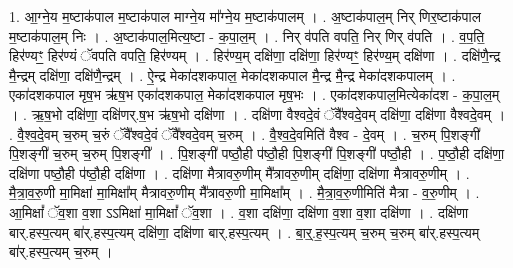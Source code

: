 \documentclass[17pt]{extarticle}
\begin{document}
1. आ॒ग्ने॒य म॒ष्टाक॑पाल म॒ष्टाक॑पाल माग्ने॒य मा᳚ग्ने॒य म॒ष्टाक॑पालम् । . अ॒ष्टाक॑पाल॒म् निर् णिर॒ष्टाक॑पाल म॒ष्टाक॑पाल॒म् निः । . अ॒ष्टाक॑पाल॒मित्य॒ष्टा - क॒पा॒ल॒म् । . निर् व॑पति वपति॒ निर् णिर् व॑पति । . व॒प॒ति॒ हिर॑ण्यꣳ॒॒ हिर॑ण्यं ॅवपति वपति॒ हिर॑ण्यम् । . हिर॑ण्य॒म् दक्षि॑णा॒ दक्षि॑णा॒ हिर॑ण्यꣳ॒॒ हिर॑ण्य॒म् दक्षि॑णा । . दक्षि॑णै॒न्द्र मै॒न्द्रम् दक्षि॑णा॒ दक्षि॑णै॒न्द्रम् । . ऐ॒न्द्र मेका॑दशकपाल॒ मेका॑दशकपाल मै॒न्द्र मै॒न्द्र मेका॑दशकपालम् । . एका॑दशकपाल मृष॒भ ऋ॑ष॒भ एका॑दशकपाल॒ मेका॑दशकपाल मृष॒भः । . एका॑दशकपाल॒मित्येका॑दश - क॒पा॒ल॒म् । . ऋ॒ष॒भो दक्षि॑णा॒ दक्षि॑णर्.ष॒भ ऋ॑ष॒भो दक्षि॑णा । . दक्षि॑णा वैश्वदे॒वं ॅवै᳚श्वदे॒वम् दक्षि॑णा॒ दक्षि॑णा वैश्वदे॒वम् । . वै॒श्व॒दे॒वम् च॒रुम् च॒रुं ॅवै᳚श्वदे॒वं ॅवै᳚श्वदे॒वम् च॒रुम् । . वै॒श्व॒दे॒वमिति॑ वैश्व - दे॒वम् । . च॒रुम् पि॒शङ्गी॑ पि॒शङ्गी॑ च॒रुम् च॒रुम् पि॒शङ्गी᳚ । . पि॒शङ्गी॑ पष्ठौ॒ही प॑ष्ठौ॒ही पि॒शङ्गी॑ पि॒शङ्गी॑ पष्ठौ॒ही । . प॒ष्ठौ॒ही दक्षि॑णा॒ दक्षि॑णा पष्ठौ॒ही प॑ष्ठौ॒ही दक्षि॑णा । . दक्षि॑णा मैत्रावरु॒णीम् मै᳚त्रावरु॒णीम् दक्षि॑णा॒ दक्षि॑णा मैत्रावरु॒णीम् । . मै॒त्रा॒व॒रु॒णी मा॒मिक्षा॑ मा॒मिक्षा᳚म् मैत्रावरु॒णीम् मै᳚त्रावरु॒णी मा॒मिक्षा᳚म् । . मै॒त्रा॒व॒रु॒णीमिति॑ मैत्रा - व॒रु॒णीम् । . आ॒मिक्षां᳚ ॅव॒शा व॒शा ऽऽमिक्षा॑ मा॒मिक्षां᳚ ॅव॒शा । . व॒शा दक्षि॑णा॒ दक्षि॑णा व॒शा व॒शा दक्षि॑णा । . दक्षि॑णा बार्.हस्प॒त्यम् बा॑र्.हस्प॒त्यम् दक्षि॑णा॒ दक्षि॑णा बार्.हस्प॒त्यम् । . बा॒र्॒.ह॒स्प॒त्यम् च॒रुम् च॒रुम् बा॑र्.हस्प॒त्यम् बा॑र्.हस्प॒त्यम् च॒रुम् । \newline
\end{document}
